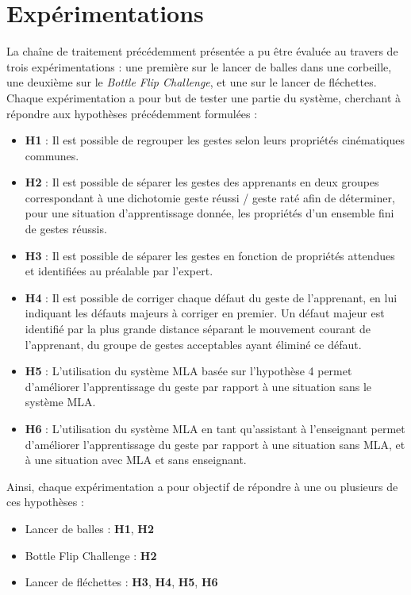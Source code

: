 \chapter{Expérimentations}\label{chap:expe}
La chaîne de traitement précédemment présentée a pu être évaluée au travers de trois expérimentations : une première sur le lancer de balles dans une corbeille, une deuxième sur le \textit{Bottle Flip Challenge}, et une sur le lancer de fléchettes. Chaque expérimentation a pour but de tester une partie du système, cherchant à répondre aux hypothèses précédemment formulées :

\begin{itemize}
	\item \textbf{H1} : Il est possible de regrouper les gestes selon leurs propriétés cinématiques communes.
	\item \textbf{H2} : Il est possible de séparer les gestes des apprenants en deux groupes correspondant à une dichotomie geste réussi / geste raté afin de déterminer, pour une situation d'apprentissage donnée, les propriétés d'un ensemble fini de gestes réussis.
	\item \textbf{H3} : Il est possible de séparer les gestes en fonction de propriétés attendues et identifiées au préalable par l'expert.
	\item \textbf{H4} : Il est possible de corriger chaque défaut du geste de l'apprenant, en lui indiquant les défauts majeurs à corriger en premier. Un défaut majeur est identifié par la plus grande distance séparant le mouvement courant de l'apprenant, du groupe de gestes acceptables ayant éliminé ce défaut.
	\item \textbf{H5} : L'utilisation du système MLA basée sur l'hypothèse 4 permet d'améliorer l'apprentissage du geste par rapport à une situation sans le système MLA.
	\item \textbf{H6} : L'utilisation du système MLA en tant qu'assistant à l'enseignant permet d'améliorer l'apprentissage du geste par rapport à une situation sans MLA, et à une situation avec MLA et sans enseignant.
\end{itemize}

Ainsi, chaque expérimentation a pour objectif de répondre à une ou plusieurs de ces hypothèses :
\begin{itemize}
	\item Lancer de balles : \textbf{H1}, \textbf{H2}
	\item Bottle Flip Challenge : \textbf{H2}
	\item Lancer de fléchettes : \textbf{H3}, \textbf{H4}, \textbf{H5}, \textbf{H6}
\end{itemize}

